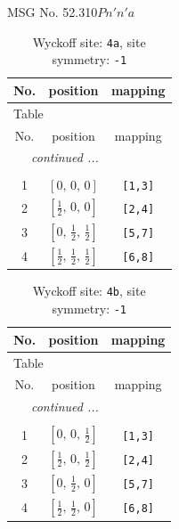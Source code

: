 \documentclass[fleqn,8pt]{jsarticle}
\begin{document}
\setcounter{MaxMatrixCols}{32}

\renewcommand{\tablename}{Table~}
\renewcommand{\figurename}{Figure~}
\begin{center}
\LARGE
MSG No. 52.310\quad$Pn'n'a$
\end{center}
\renewcommand{\arraystretch}{1.2}
\begin{longtable}{ccc}
\caption{Wyckoff site: {\tt 4a}, site symmetry: {\tt -1}}
 \\
 \hline \hline
No. & position & mapping \\ \hline \endfirsthead

\multicolumn{2}{l}{\tablename\ \thetable{}} \\
 \hline \hline
No. & position & mapping \\ \hline \endhead

 \hline \hline
\multicolumn{2}{r}{\footnotesize\it continued ...} \\ \endfoot

 \hline \hline
\multicolumn{2}{r}{} \\ \endlastfoot

1 & $\left[ 0,\, 0,\, 0 \right]$ & {\tt [1,3]} \\ \hline
2 & $\left[ \frac{1}{2},\, 0,\, 0 \right]$ & {\tt [2,4]} \\ \hline
3 & $\left[ 0,\, \frac{1}{2},\, \frac{1}{2} \right]$ & {\tt [5,7]} \\ \hline
4 & $\left[ \frac{1}{2},\, \frac{1}{2},\, \frac{1}{2} \right]$ & {\tt [6,8]} \\
\end{longtable}
\renewcommand{\arraystretch}{1.2}
\begin{longtable}{ccc}
\caption{Wyckoff site: {\tt 4b}, site symmetry: {\tt -1}}
 \\
 \hline \hline
No. & position & mapping \\ \hline \endfirsthead

\multicolumn{2}{l}{\tablename\ \thetable{}} \\
 \hline \hline
No. & position & mapping \\ \hline \endhead

 \hline \hline
\multicolumn{2}{r}{\footnotesize\it continued ...} \\ \endfoot

 \hline \hline
\multicolumn{2}{r}{} \\ \endlastfoot

1 & $\left[ 0,\, 0,\, \frac{1}{2} \right]$ & {\tt [1,3]} \\ \hline
2 & $\left[ \frac{1}{2},\, 0,\, \frac{1}{2} \right]$ & {\tt [2,4]} \\ \hline
3 & $\left[ 0,\, \frac{1}{2},\, 0 \right]$ & {\tt [5,7]} \\ \hline
4 & $\left[ \frac{1}{2},\, \frac{1}{2},\, 0 \right]$ & {\tt [6,8]} \\
\end{longtable}
\end{document}
